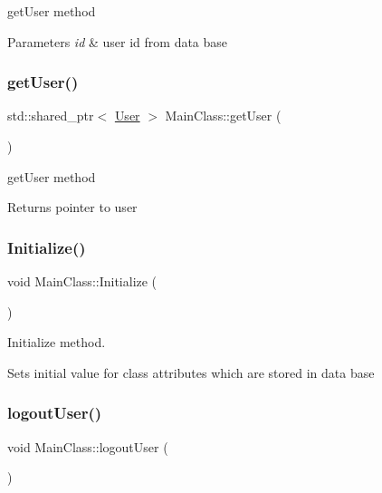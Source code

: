 get\+User method 


\begin{DoxyParams}{Parameters}
{\em id} & user id from data base \\
\hline
\end{DoxyParams}
\mbox{\label{class_main_class_a3ba58a65d27df922c34de2fc6208bb31}} 
\subsubsection{\texorpdfstring{get\+User()}{getUser()}\hspace{0.1cm}{\footnotesize\ttfamily [2/2]}}
{\footnotesize\ttfamily std\+::shared\+\_\+ptr$<$ \hyperlink{class_user}{User} $>$ Main\+Class\+::get\+User (\begin{DoxyParamCaption}{ }\end{DoxyParamCaption})}



get\+User method 

\begin{DoxyReturn}{Returns}
pointer to user 
\end{DoxyReturn}
\mbox{\label{class_main_class_a91e4a76fcf2576ccf592373e4786fc42}} 
\subsubsection{\texorpdfstring{Initialize()}{Initialize()}}
{\footnotesize\ttfamily void Main\+Class\+::\+Initialize (\begin{DoxyParamCaption}{ }\end{DoxyParamCaption})}



Initialize method. 

Sets initial value for class attributes which are stored in data base \mbox{\label{class_main_class_ad3beecfb06b5105b79a9dd53dc620811}} 
\subsubsection{\texorpdfstring{logout\+User()}{logoutUser()}}
{\footnotesize\ttfamily void Main\+Class\+::logout\+User (\begin{DoxyParamCaption}{ }\end{DoxyParamCaption})}



